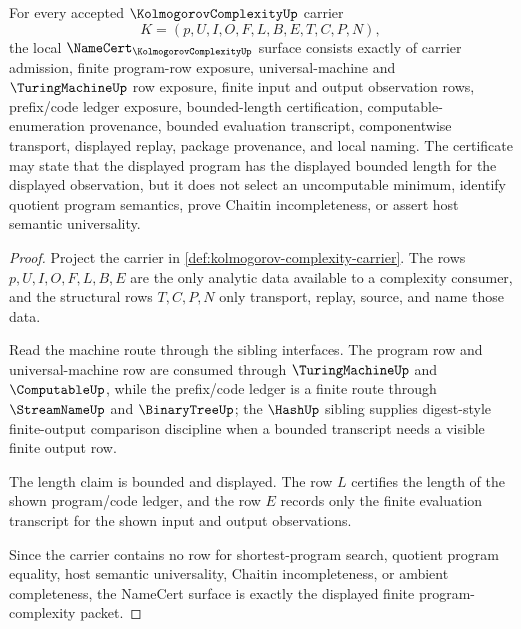 \begin{theorem}
\label{thm:kolmogorov-complexity-namecert-obligations}
For every accepted $\KolmogorovComplexityUp$ carrier
$$
K=(p,U,I,O,F,L,B,E,T,C,P,N),
$$
the local $\NameCert_{\KolmogorovComplexityUp}$ surface consists exactly of carrier admission, finite program-row exposure, universal-machine and $\TuringMachineUp$ row exposure, finite input and output observation rows, prefix/code ledger exposure, bounded-length certification, computable-enumeration provenance, bounded evaluation transcript, componentwise transport, displayed replay, package provenance, and local naming. The certificate may state that the displayed program has the displayed bounded length for the displayed observation, but it does not select an uncomputable minimum, identify quotient program semantics, prove Chaitin incompleteness, or assert host semantic universality.
\end{theorem}
\begin{proof}
Project the carrier in \autoref{def:kolmogorov-complexity-carrier}. The rows $p,U,I,O,F,L,B,E$ are the only analytic data available to a complexity consumer, and the structural rows $T,C,P,N$ only transport, replay, source, and name those data.

Read the machine route through the sibling interfaces. The program row and universal-machine row are consumed through $\TuringMachineUp$ and $\ComputableUp$, while the prefix/code ledger is a finite route through $\StreamNameUp$ and $\BinaryTreeUp$; the $\HashUp$ sibling supplies digest-style finite-output comparison discipline when a bounded transcript needs a visible finite output row.

The length claim is bounded and displayed. The row $L$ certifies the length of the shown program/code ledger, and the row $E$ records only the finite evaluation transcript for the shown input and output observations.

Since the carrier contains no row for shortest-program search, quotient program equality, host semantic universality, Chaitin incompleteness, or ambient completeness, the NameCert surface is exactly the displayed finite program-complexity packet.
\end{proof}


